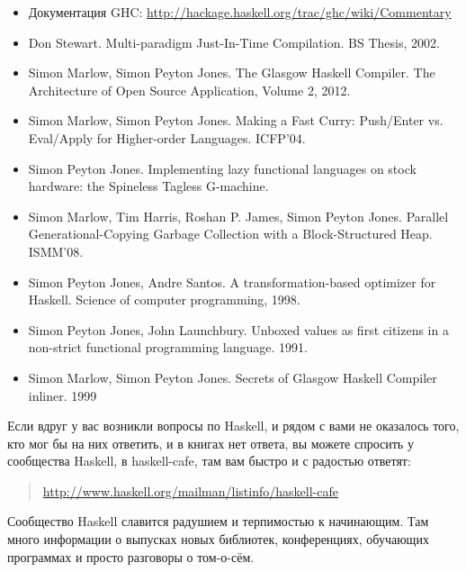 \begin{itemize}
\item Документация GHC:
\url{http://hackage.haskell.org/trac/ghc/wiki/Commentary}

\item Don Stewart. Multi-paradigm Just-In-Time Compilation. BS Thesis, 2002.

\item Simon Marlow, Simon Peyton Jones. The Glasgow Haskell Compiler. 
    The Architecture of Open Source Application, Volume 2, 2012.

\item Simon Marlow, Simon Peyton Jones. Making a Fast Curry: Push/Enter vs.
    Eval/Apply for Higher-order Languages. ICFP'04.

\item Simon Peyton Jones. Implementing lazy functional languages
on stock hardware: the Spineless Tagless G-machine.

\item Simon Marlow, Tim Harris, Roshan P. James, Simon Peyton Jones.
    Parallel Generational-Copying Garbage Collection with a 
    Block-Structured Heap. ISMM'08.

\item Simon Peyton Jones, Andre Santos. 
    A transformation-based optimizer for Haskell.
    Science of computer programming, 1998.

\item Simon Peyton Jones, John Launchbury. 
    Unboxed values as first citizens in a non-strict 
    functional programming language. 1991.

\item Simon Marlow, Simon Peyton Jones. 
    Secrets of Glasgow Haskell Compiler inliner. 1999
\end{itemize}





Если вдруг у вас возникли вопросы по Haskell, и рядом с вами не оказалось
того, кто мог бы на них ответить, и в книгах нет ответа, вы 
можете спросить у сообщества Haskell,
в haskell-cafe, там вам быстро и с радостью ответят:

\begin{quote}
\url{http://www.haskell.org/mailman/listinfo/haskell-cafe}
\end{quote}

Сообщество Haskell славится радушием и терпимостью 
к начинающим. Там много информации о выпусках новых библиотек,
конференциях, обучающих программах и просто разговоры о том-о-сём.

